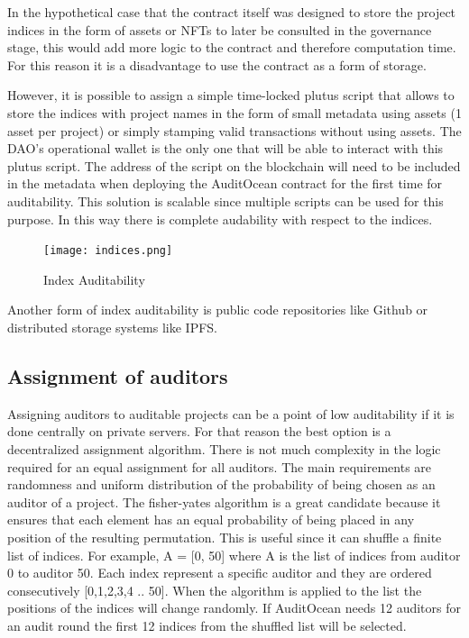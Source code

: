 \documentclass[9pt]{article}
\begin{document}
In the hypothetical case that the contract itself was designed to store the project indices in the form of assets or NFTs to later be consulted in the governance stage, this would add more logic to the contract and therefore computation time. For this reason it is a disadvantage to use the contract as a form of storage.

However, it is possible to assign a simple time-locked plutus script that allows to store the indices with project names in the form of small metadata using assets (1 asset per project) or simply stamping valid transactions without using assets. The DAO's operational wallet is the only one that will be able to interact with this plutus script. The address of the script on the blockchain will need to be included in the metadata when deploying the AuditOcean contract for the first time for auditability. This solution is scalable since multiple scripts can be used for this purpose. In this way there is complete audability with respect to the indices.


\begin{figure}[ht]
  \centering
  \texttt{[image: indices.png]}
  \caption{Index Auditability
  }
  \label{fig:mi_imagen}
\end{figure}

Another form of index auditability is public code repositories like Github or distributed storage systems like IPFS.
\subsection { Assignment of auditors }
   
Assigning auditors to auditable projects can be a point of low auditability if it is done centrally on private servers. For that reason the best option is a decentralized assignment algorithm. There is not much complexity in the logic required for an equal assignment for all auditors. The main requirements are randomness and uniform distribution of the probability of being chosen as an auditor of a project. The fisher-yates algorithm is a great candidate because it ensures that each element has an equal probability of being placed in any position of the resulting permutation. This is useful since it can shuffle a finite list of indices. For example, A = [0, 50] where A is the list of indices from auditor 0 to auditor 50. Each index represent a specific auditor and they are ordered consecutively [0,1,2,3,4 .. 50]. When the algorithm is applied to the list the positions of the indices will change randomly. If AuditOcean needs 12 auditors for an audit round the first 12 indices from the shuffled list will be selected.\\
\end{document}
